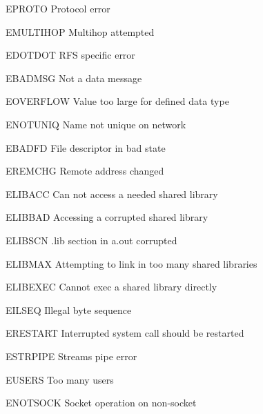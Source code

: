 \begin{datadesc}{EPROTO} Protocol error \end{datadesc}
\begin{datadesc}{EMULTIHOP} Multihop attempted \end{datadesc}
\begin{datadesc}{EDOTDOT} RFS specific error \end{datadesc}
\begin{datadesc}{EBADMSG} Not a data message \end{datadesc}
\begin{datadesc}{EOVERFLOW} Value too large for defined data type \end{datadesc}
\begin{datadesc}{ENOTUNIQ} Name not unique on network \end{datadesc}
\begin{datadesc}{EBADFD} File descriptor in bad state \end{datadesc}
\begin{datadesc}{EREMCHG} Remote address changed \end{datadesc}
\begin{datadesc}{ELIBACC} Can not access a needed shared library \end{datadesc}
\begin{datadesc}{ELIBBAD} Accessing a corrupted shared library \end{datadesc}
\begin{datadesc}{ELIBSCN} .lib section in a.out corrupted \end{datadesc}
\begin{datadesc}{ELIBMAX} Attempting to link in too many shared libraries \end{datadesc}
\begin{datadesc}{ELIBEXEC} Cannot exec a shared library directly \end{datadesc}
\begin{datadesc}{EILSEQ} Illegal byte sequence \end{datadesc}
\begin{datadesc}{ERESTART} Interrupted system call should be restarted \end{datadesc}
\begin{datadesc}{ESTRPIPE} Streams pipe error \end{datadesc}
\begin{datadesc}{EUSERS} Too many users \end{datadesc}
\begin{datadesc}{ENOTSOCK} Socket operation on non-socket \end{datadesc}
